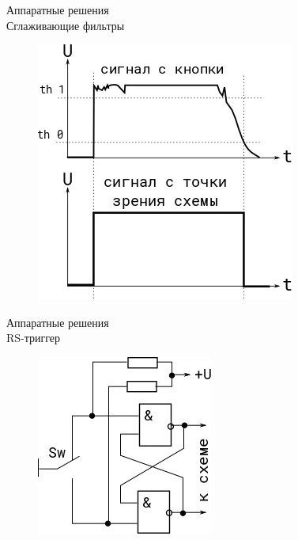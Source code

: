 \documentclass[12pt,a4paper,mathserif]{beamer}
\begin{document}
\begin{frame}{Аппаратные решения\\Сглаживающие фильтры}
    \begin{figure}
        \centering
        \includegraphics[scale=0.8]{shmidt.png}
        \label{fig:shmidt}
    \end{figure}
\end{frame}

\begin{frame}{Аппаратные решения\\RS-триггер}
    \begin{figure}
        \centering
        \includegraphics{RS.png}
        \label{fig:rs}
    \end{figure}
\end{frame}
\end{document}
